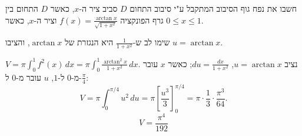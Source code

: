 
\begin{question}
חשבו את נפח גוף הסיבוב המתקבל ע"י סיבוב התחום $D$ סביב ציר ה-$x$, כאשר $D$ התחום בין גרף הפונקציה $f(x)=\frac{\arctan x}{\sqrt{1+x^2}}$ וציר ה-$x$, כאשר $0\le x\le1$.
\end{question}

\begin{hint}
שימו לב ש-$\frac{1}{1+x^2}$ היא הנגזרת של $\arctan x$, והציבו $u=\arctan x$.
\end{hint}

\begin{solution}
$V=\pi\int_0^1 f^2(x)\,dx=\pi\int_0^1\frac{\arctan^2x}{1+x^2}\,dx$. נציב $u=\arctan x$, $du=\frac{dx}{1+x^2}$; כאשר $x$ עובר מ-$0$ ל-$1$, $u$ עובר מ-$0$ ל-$\frac\pi4$:
\[ V=\pi\int_0^{\pi/4}u^2\,du=\pi\left[\frac{u^3}{3}\right]_0^{\pi/4}=\pi\cdot\frac{1}{3}\cdot\frac{\pi^3}{64}. \]
\[ \boxed{V=\frac{\pi^4}{192}} \]
\end{solution}
